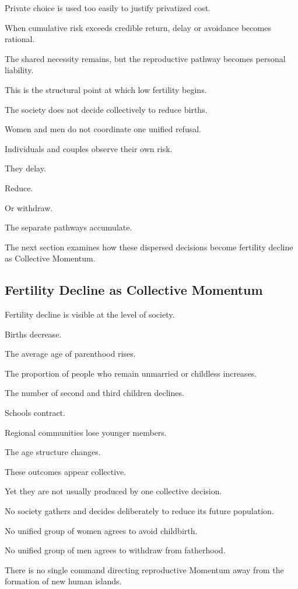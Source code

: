 Private choice is used too easily to justify privatized cost.

When cumulative risk exceeds credible return, delay or avoidance becomes rational.

The shared necessity remains, but the reproductive pathway becomes personal liability.

This is the structural point at which low fertility begins.

The society does not decide collectively to reduce births.

Women and men do not coordinate one unified refusal.

Individuals and couples observe their own risk.

They delay.

Reduce.

Or withdraw.

The separate pathways accumulate.

The next section examines how these dispersed decisions become fertility decline as Collective Momentum.

\subsection*{\textbf{Fertility Decline as Collective Momentum}} 


Fertility decline is visible at the level of society.

Births decrease.

The average age of parenthood rises.

The proportion of people who remain unmarried or childless increases.

The number of second and third children declines.

Schools contract.

Regional communities lose younger members.

The age structure changes.

These outcomes appear collective.

Yet they are not usually produced by one collective decision.

No society gathers and decides deliberately to reduce its future population.

No unified group of women agrees to avoid childbirth.

No unified group of men agrees to withdraw from fatherhood.

There is no single command directing reproductive Momentum away from the formation of new human islands.


